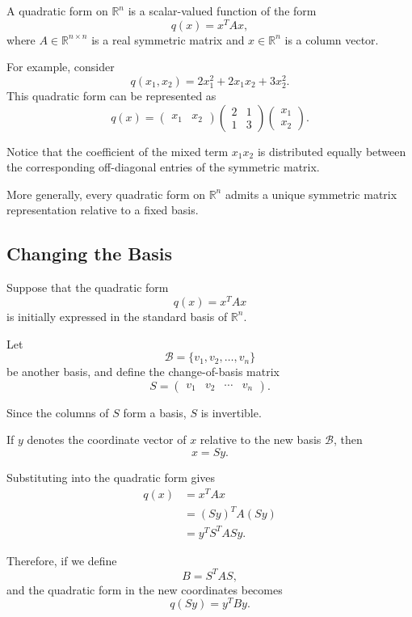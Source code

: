 \documentclass[11pt]{article}
\theoremstyle{definition}
\theoremstyle{remark}
\begin{document}
A quadratic form on $\mathbb{R}^n$ is a scalar-valued
function of the form
\[
    q(x)=x^TAx,
\]
where $A\in\mathbb{R}^{n\times n}$ is a real symmetric
matrix and $x\in\mathbb{R}^n$ is a column vector.

For example, consider
\[
    q(x_1,x_2)=2x_1^2+2x_1x_2+3x_2^2.
\]
This quadratic form can be represented as
\[
    q(x)=
    \begin{pmatrix}x_1&x_2\end{pmatrix}
    \begin{pmatrix}
        2&1\\
        1&3
    \end{pmatrix}
    \begin{pmatrix}x_1\\x_2\end{pmatrix}.
\]

Notice that the coefficient of the mixed term
$x_1x_2$ is distributed equally between the
corresponding off-diagonal entries of the
symmetric matrix.

More generally, every quadratic form on
$\mathbb{R}^n$ admits a unique symmetric
matrix representation relative to a fixed basis.

\subsection{Changing the Basis}

Suppose that the quadratic form
\[
    q(x)=x^TAx
\]
is initially expressed in the standard basis
of $\mathbb{R}^n$.

Let
\[
    \mathcal{B}=\{v_1,v_2,\ldots,v_n\}
\]
be another basis, and define the change-of-basis
matrix
\[
    S=\begin{pmatrix}v_1&v_2&\cdots&v_n\end{pmatrix}.
\]

Since the columns of $S$ form a basis,
$S$ is invertible.

If $y$ denotes the coordinate vector of $x$
relative to the new basis $\mathcal{B}$, then
\[
    x=Sy.
\]

Substituting into the quadratic form gives
\[
\begin{aligned}
    q(x)
    &=x^TAx\\
    &=(Sy)^TA(Sy)\\
    &=y^TS^TASy.
\end{aligned}
\]

Therefore, if we define
\[
    \boxed{B=S^TAS},
\]
and the quadratic form in the new coordinates becomes
\[
    q(Sy)=y^TBy.
\]
\end{document}
